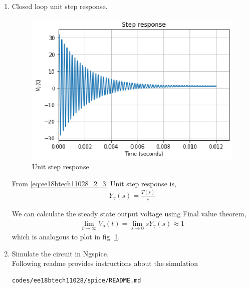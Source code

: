 \begin{enumerate}[label=\arabic*.,ref=\theenumi]
\item Closed loop unit step response.
\\
\solution 
\begin{figure}[!ht]
    \centering
    \includegraphics[width=\columnwidth]{./figs/ee18btech11028/step_response.eps}
    \caption{Unit step response}
    \label{fig:ee18btech11028_2_5}
\end{figure}


From \eqref{eq:ee18btech11028_2_3} Unit step response is,
\begin{align}
    Y_{\gamma}(s) = \frac{T(s)}{s}
\end{align}

We can calculate the steady state output voltage using Final value theorem,
\begin{align}
    \lim_{t\to\infty} V_{o}(t) = \lim_{s \to 0} sY_{\gamma}(s) \approx 1
\end{align}
which is analogous to plot in fig. \ref{fig:ee18btech11028_2_5}.
\item Simulate the circuit in Ngspice.
\\
\solution Following readme provides instructions about the simulation

\begin{lstlisting}
codes/ee18btech11028/spice/README.md
\end{lstlisting}


\end{enumerate}
